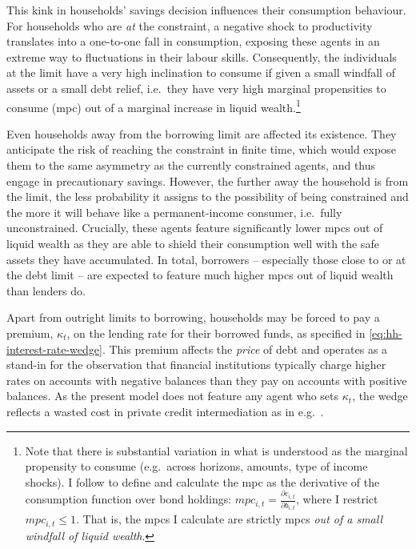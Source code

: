 \documentclass[a4paper,12pt]{article} %
\numberwithin{equation}{section} %
\numberwithin{figure}{section}
\numberwithin{table}{section}
\begin{document}
This kink in households' savings decision influences their consumption behaviour. For households who are \textit{at} the constraint, a negative shock to productivity translates into a one-to-one fall in consumption, exposing these agents in an extreme way to fluctuations in their labour skills. Consequently, the individuals at the limit have a very high inclination to consume if given a small windfall of assets or a small debt relief, i.e.~they have very high marginal propensities to consume (\Gls{mpc}) out of a marginal increase in liquid wealth.\footnote{Note that there is substantial variation in what is understood as the marginal propensity to consume (e.g.~across horizons, amounts, type of income shocks). I follow \textcite{gl2017} to define and calculate the \Gls{mpc} as the derivative of the consumption function over bond holdings: $mpc_{i,t} = \frac{\partial c_{i,t}}{\partial b_{i,t}}$, where I restrict $mpc_{i,t} \le 1$. That is, the \Gls{mpc}s I calculate are strictly \Gls{mpc}s \textit{out of a small windfall of liquid wealth}.}

Even households away from the borrowing limit are affected its existence. They anticipate the risk of reaching the constraint in finite time, which would expose them to the same asymmetry as the currently constrained agents, and thus engage in precautionary savings. However, the further away the household is from the limit, the less probability it assigns to the possibility of being constrained and the more it will behave like a permanent-income consumer, i.e.~fully unconstrained. Crucially, these agents feature significantly lower \Gls{mpc}s out of liquid wealth as they are able to shield their consumption well with the safe assets they have accumulated. In total, borrowers -- especially those close to or at the debt limit -- are expected to feature much higher \Gls{mpc}s out of liquid wealth than lenders do.

Apart from outright limits to borrowing, households may be forced to pay a premium, $\kappa_t$, on the lending rate for their borrowed funds, as specified in \eqref{eq:hh-interest-rate-wedge}. This premium affects the \textit{price} of debt and operates as a stand-in for the observation that financial institutions typically charge higher rates on accounts with negative balances than they pay on accounts with positive balances. As the present model does not feature any agent who sets $\kappa_t$, the wedge reflects a wasted cost in private credit intermediation as in e.g.~\textcite{bayer2023}.
\end{document}
